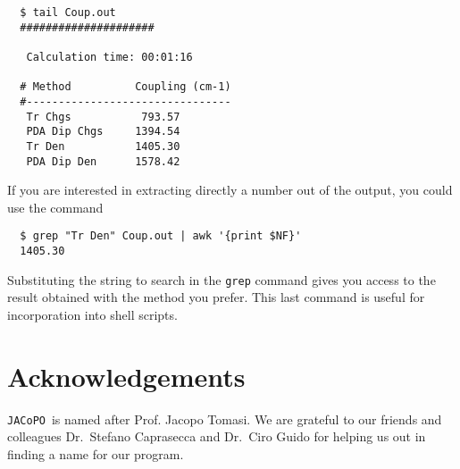 \documentclass[a4paper]{article}
\newcommand{\jacopo}{\texttt{JACoPO}}
\begin{document}
\begin{verbatim}
  $ tail Coup.out
  #####################

   Calculation time: 00:01:16
  
  # Method          Coupling (cm-1)
  #--------------------------------
   Tr Chgs           793.57 
   PDA Dip Chgs     1394.54 
   Tr Den           1405.30 
   PDA Dip Den      1578.42  
\end{verbatim}

If you are interested in extracting directly a number out of the output, you could use the command

\begin{verbatim}
  $ grep "Tr Den" Coup.out | awk '{print $NF}'
  1405.30
\end{verbatim}

Substituting the string to search in the \verb|grep| command gives you access to the result obtained with the method you prefer.
This last command is useful for incorporation into shell scripts.

\section*{Acknowledgements}
\jacopo\ is named after Prof. Jacopo Tomasi. We are grateful to our friends and colleagues Dr.~Stefano Caprasecca and Dr.~Ciro Guido for helping us out in finding a name for our program.



\end{document}
